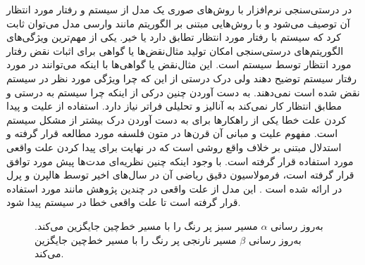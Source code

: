 در درستی‌سنجی نرم‌افزار با روش‌های صوری یک مدل از سیستم و رفتار 
مورد انتظار آن توصیف می‌شود و با روش‌هایی مبتنی بر الگوریتم مانند وارسی مدل
 \cite{clarke1997model}
می‌توان ثابت کرد که سیستم با رفتار مورد انتظار تطابق دارد یا خیر.
یکی از مهم‌ترین ویژگی‌های الگوریتم‌های درستی‌سنجی امکان تولید مثال‌نقض‌ها
یا گواهی
برای اثبات نقض رفتار مورد انتظار توسط سیستم است.
این مثال‌نقض‌ یا گواهی‌ها با اینکه می‌توانند در مورد رفتار سیستم توضیح دهند ولی درک درستی از این که چرا ویژگی مورد نظر در سیستم نقض شده است نمی‌دهند.
به دست آوردن چنین درکی از اینکه چرا سیستم به درستی و مطابق انتظار کار نمی‌کند به آنالیز و تحلیلی فراتر نیاز دارد.
استفاده از علیت
و پیدا کردن علت خطا
یکی از راهکار‌ها برای به دست آوردن درک بیشتر از مشکل سیستم است.
مفهوم علیت و مبانی آن قرن‌ها در متون فلسفه مورد مطالعه قرار گرفته و استدلال مبتنی بر خلاف واقع روشی است که در نهایت برای پیدا کردن علت واقعی مورد استفاده قرار گرفته است.
با وجود اینکه چنین نظریه‌ای مدت‌ها پیش مورد توافق قرار گرفته است، فرمولاسیون دقیق ریاضی آن در سال‌های اخیر توسط هالپرن
و پرل
در 
\cite{hp}
ارائه شده است \cite{explications}.
این مدل از علت واقعی در چندین پژوهش مانند 
\cite{Caltais-LTL,causal-hml,causality-checking,chockler}
 مورد استفاده قرار گرفته است تا علت واقعی خطا در سیستم پیدا شود. 
\begin{figure}
    \centering
    \caption{
        به‌روز رسانی 
        $\alpha$
        مسیر سبز پر رنگ‌ را با مسیر خط‌چین جایگزین می‌کند.
        به‌روز رسانی
        $\beta$
        مسیر نارنجی پر رنگ را با مسیر خط‌چین جایگزین می‌کند.
     }
    \label{fig:intro:example}
\end{figure}
